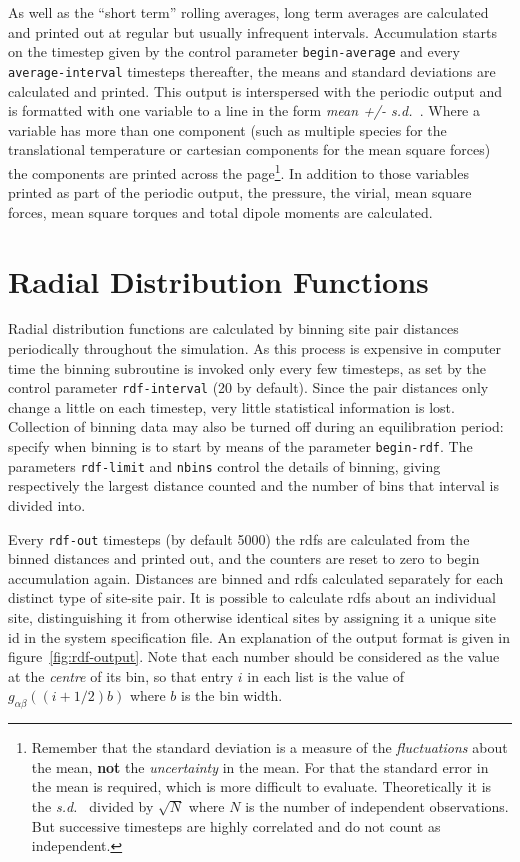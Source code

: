 As well as the ``short term'' rolling averages, long term averages are
calculated and printed out at regular but usually infrequent
intervals.  Accumulation starts on the timestep given by the control
parameter \verb'begin-average' and every \verb'average-interval'
timesteps thereafter, the means and standard deviations are calculated
and printed.  This output is interspersed with the periodic output and
is formatted with one variable to a line in the form {\em mean +/-
s.d.\ }. Where a variable has more than one component (such as
multiple species for the translational temperature or cartesian
components for the mean square forces) the components are printed
across the page\footnote{Remember that the standard deviation is a
measure of the {\em fluctuations} about the mean, {\bf not} the {\em
uncertainty} in the mean. For that the standard error in the mean is
required, which is more difficult to evaluate.  Theoretically it is
the {\em s.d.\ } divided by $\sqrt N$ where $N$ is the number of
independent observations.  But successive timesteps are highly
correlated and do not count as independent.}.  In addition to those
variables printed as part of the periodic output, the pressure, the
virial, mean square forces, mean square torques and total dipole
moments are calculated.

\section{Radial Distribution Functions}

Radial distribution functions are calculated by binning site pair
distances periodically throughout the simulation.  As this process is
expensive in computer time the binning subroutine is invoked only
every few timesteps, as set by the control parameter
\verb'rdf-interval' (20 by default).  Since the pair distances only
change a little on each timestep, very little statistical information
is lost.  Collection of binning data may also be
turned off during an equilibration period: specify when binning is to
start by means of the parameter \verb'begin-rdf'.  The parameters
\verb'rdf-limit' and \verb'nbins' control the details of binning,
giving respectively the largest distance counted and the number of
bins that interval is divided into.

Every \verb'rdf-out' timesteps (by default 5000) the rdfs are
calculated from the binned distances and printed out, and the counters
are reset to zero to begin accumulation again.  Distances are binned
and rdfs calculated separately for each distinct type of site-site
pair.  It is possible to calculate rdfs about an individual site,
distinguishing it from otherwise identical sites by assigning it a
unique site id in the system specification file.  An explanation of
the output format is given in figure~\ref{fig:rdf-output}.  Note that
each number should be considered as the value at the {\em centre} of
its bin, so that entry $i$ in each list is the value of
$g_{\alpha\beta}((i+1/2)b)$ where $b$ is the bin width.

